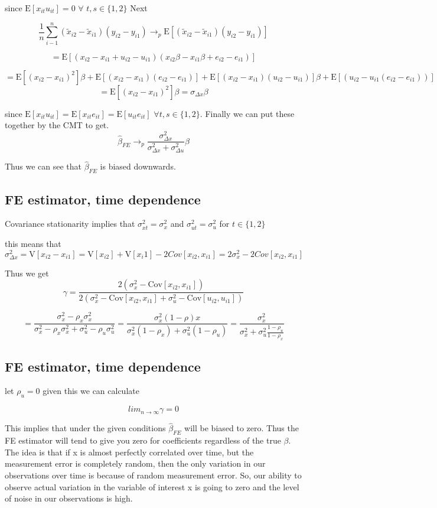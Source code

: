 \documentclass[11pt]{article}
\newcommand{\Cov}{\mathrm{Cov}}
\newcommand{\plim}{\rightarrow_{p}}
\newcommand{\E}{\mathrm{E}}
\newcommand{\V}{\mathrm{V}}
\begin{document}
  since $\E[x_{it}u_{it}] = 0$ $\forall$ $t,s \in \{1,2\}$ Next 
  
  $$\frac{1}{n} \sum_{i-1}^{n}(\tilde{x}_{i2} - \tilde{x}_{i1} )(y_{i2} - y_{i1}) \plim \E[(\tilde{x}_{i2} - \tilde{x}_{i1} )(y_{i2} - y_{i1})]$$
  
  $$ = \E[(x_{i2} - x_{i1} + u_{i2} -u_{i1})(x_{i2}\beta - x_{i1}\beta + e_{i2} - e_{i1})]$$
  
  $$ = \E[(x_{i2}-x_{i1})^2]\beta + \E[(x_{i2}-x_{i1})(e_{i2}-e_{i1})] + \E[(x_{i2}-x_{i1})( u_{i2} -u_{i1})]\beta + \E[(u_{i2} - u_{i1}(e_{i2} - e_{i1}))]
$$
$$ = \E[(x_{i2} - x_{i1})^2]\beta = \sigma_{\Delta x}\beta $$

since $\E[x_{it}u_{it}] = \E[x_{it}e_{it}] =  \E[u_{it}e_{it}] $ $\forall t,s \in \{1,2\}$. Finally we can put these together by the CMT to get. 
$$ \hat{\beta}_{FE} \plim \frac{\sigma_{\Delta x}^2}{\sigma_{\Delta x}^2 + \sigma_{\Delta u}^2} \beta
$$

Thus we can see that $\hat{\beta}_{FE}$ is biased downwards.

\subsection{FE estimator, time dependence}
Covariance stationarity implies that $\sigma_{xt}^2 = \sigma_x^2$ and $\sigma_{ut}^2 = \sigma_u^2$ for $t \in \{1,2\}$

this means that 
$$\sigma_{\Delta x}^2 =  \V[x_{i2} - x_{i1}] = \V[x_{i2}] + \V[x_i1] - 2Cov[x_{i2},x_{i1}] = 2\sigma_x^2 - 2Cov[x_{i2}, x_{i1}] $$

Thus we get 
$$\gamma = \frac{2(\sigma_x^2 - \Cov[x_{i2}, x_{i1}])}{2(\sigma_x^2 - \Cov[x_{i2}, x_{i1}] + \sigma_u^2 - \Cov[u_{i2}, u_{i1}])}$$

$$
= \frac{\sigma_x^2 - \rho_x \sigma_x^2 }{\sigma_x^2 - \rho_x \sigma_x^2 + \sigma_u^2 - \rho_u \sigma_u^2} = \frac{\sigma_x^2(1-\rho)x}{\sigma_x^2(1-\rho_x) + \sigma_u^2(1-\rho_u)} = \frac{\sigma_x^2}{\sigma_x^2 + \sigma_u^2 \frac{1-\rho_u}{1-\rho_x}}
$$

\subsection{FE estimator, time dependence}

let $\rho_u = 0$ given this we can calculate

$$ lim_{n\to\infty} \gamma = 0$$

This implies that under the given conditions $\hat{\beta}_{FE}$ will be biased to zero. Thus the FE estimator will tend to give you zero for coefficients regardless of the true $\beta$.
The idea is that if x is almost perfectly correlated over time, but the measurement error is completely random, then the only variation in our observations over time is because of random measurement error. So, our ability to observe actual variation in the variable of interest x is going to zero and the level of noise in our observations is high. 
\end{document}
